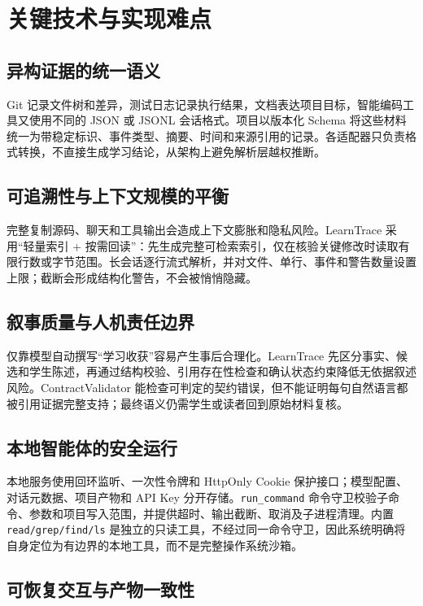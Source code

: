 \documentclass[UTF8,a4paper,12pt]{ctexart}
\begin{document}
\section{关键技术与实现难点}

\subsection{异构证据的统一语义}

Git 记录文件树和差异，测试日志记录执行结果，文档表达项目目标，智能编码工具又使用不同的 JSON 或 JSONL 会话格式。项目以版本化 Schema 将这些材料统一为带稳定标识、事件类型、摘要、时间和来源引用的记录。各适配器只负责格式转换，不直接生成学习结论，从架构上避免解析层越权推断。

\subsection{可追溯性与上下文规模的平衡}

完整复制源码、聊天和工具输出会造成上下文膨胀和隐私风险。LearnTrace 采用“轻量索引 + 按需回读”：先生成完整可检索索引，仅在核验关键修改时读取有限行数或字节范围。长会话逐行流式解析，并对文件、单行、事件和警告数量设置上限；截断会形成结构化警告，不会被悄悄隐藏。

\subsection{叙事质量与人机责任边界}

仅靠模型自动撰写“学习收获”容易产生事后合理化。LearnTrace 先区分事实、候选和学生陈述，再通过结构校验、引用存在性检查和确认状态约束降低无依据叙述风险。ContractValidator 能检查可判定的契约错误，但不能证明每句自然语言都被引用证据完整支持；最终语义仍需学生或读者回到原始材料复核。

\subsection{本地智能体的安全运行}

本地服务使用回环监听、一次性令牌和 HttpOnly Cookie 保护接口；模型配置、对话元数据、项目产物和 API Key 分开存储。\texttt{run\_command} 命令守卫校验子命令、参数和项目写入范围，并提供超时、输出截断、取消及子进程清理。内置 \texttt{read/grep/find/ls} 是独立的只读工具，不经过同一命令守卫，因此系统明确将自身定位为有边界的本地工具，而不是完整操作系统沙箱。

\subsection{可恢复交互与产物一致性}
\end{document}
